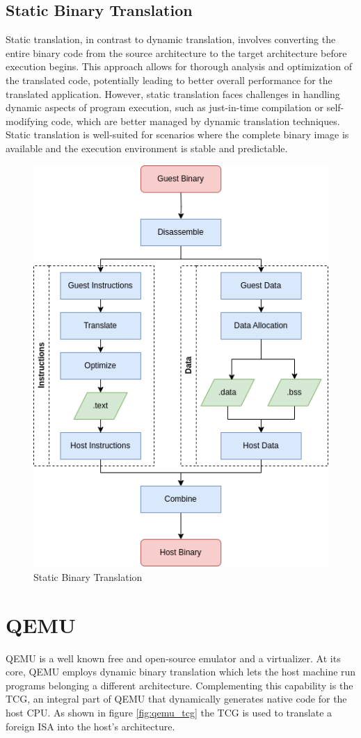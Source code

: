 \subsection{Static Binary Translation}
Static translation, in contrast to dynamic translation, involves converting the entire binary code from the source architecture to the target architecture before execution begins.
This approach allows for thorough analysis and optimization of the translated code, potentially leading to better overall performance for the translated application.
However, static translation faces challenges in handling dynamic aspects of program execution, such as just-in-time compilation or self-modifying code, which are better managed by dynamic translation techniques.
Static translation is well-suited for scenarios where the complete binary image is available and the execution environment is stable and predictable.
\begin{figure}[ht]
    \centering
    \includegraphics[width=0.6\linewidth]{figures/sta_bin_trans}
    \caption{Static Binary Translation}
    \label{fig:static_binary_translation}
\end{figure}

\section{QEMU}
\ac{QEMU} is a well known free and open-source emulator and a virtualizer. 
At its core, \ac{QEMU} employs dynamic binary translation which lets the host machine run programs belonging a different architecture.
Complementing this capability is the \ac{TCG}, an integral part of \ac{QEMU} that dynamically generates native code for the host CPU.
As shown in figure \ref{fig:qemu_tcg} the \ac{TCG} is used to translate a foreign ISA into the host's architecture.

